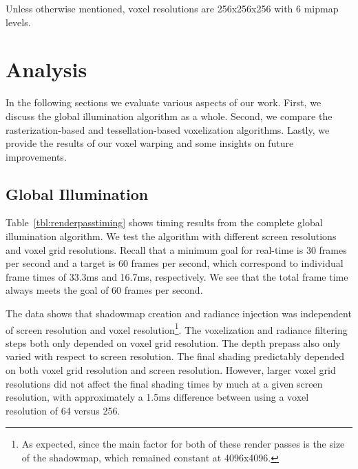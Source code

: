 Unless otherwise mentioned, voxel resolutions are 256x256x256 with 6 mipmap levels.

\section{Analysis}
In the following sections we evaluate various aspects of our work. First, we discuss the global illumination algorithm as a whole. Second, we compare the rasterization-based and tessellation-based voxelization algorithms. Lastly, we provide the results of our voxel warping and some insights on future improvements.

\subsection{Global Illumination}
Table~\ref{tbl:renderpasstiming} shows timing results from the complete global illumination algorithm. We test the algorithm with different screen resolutions and voxel grid resolutions. Recall that a minimum goal for real-time is 30 frames per second and a target is 60 frames per second, which correspond to individual frame times of 33.3ms and 16.7ms, respectively. We see that the total frame time always meets the goal of 60 frames per second.

The data shows that shadowmap creation and radiance injection was independent of screen resolution and voxel resolution\footnote{As expected, since the main factor for both of these render passes is the size of the shadowmap, which remained constant at 4096x4096.}. The voxelization and radiance filtering steps both only depended on voxel grid resolution. The depth prepass also only varied with respect to screen resolution. The final shading predictably depended on both voxel grid resolution and screen resolution. However, larger voxel grid resolutions did not affect the final shading times by much at a given screen resolution, with approximately a 1.5ms difference between using a voxel resolution of 64 versus 256.

